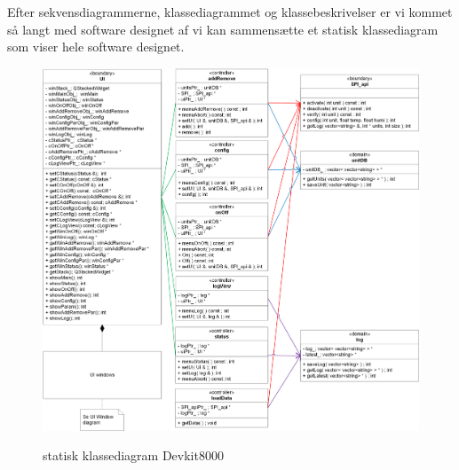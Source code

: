 
\vspace{5 mm}

Efter sekvensdiagrammerne, klassediagrammet og klassebeskrivelser er vi kommet så langt med software designet af vi kan sammensætte et statisk klassediagram som viser hele software designet.


\vspace{10 mm}

\begin{figure}[!htbp] \centering
{\includegraphics[scale=0.7]{filer/design/sw_class_devkit_static}}
\caption{statisk klassediagram Devkit8000}
\label{fig:class_static_dev}
\end{figure}

